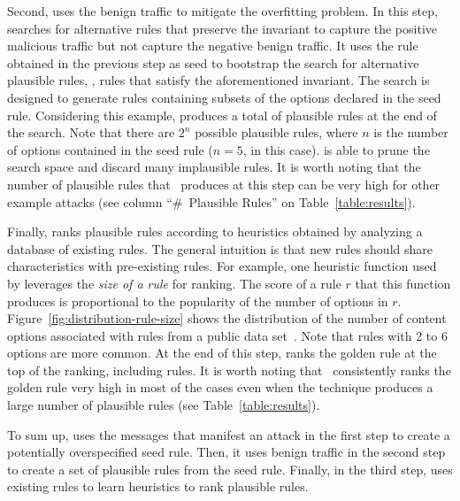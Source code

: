 \documentclass[sigconf,review, anonymous]{acmart}
\begin{document}


Second, \tname{} uses the benign traffic to mitigate the overfitting
problem. In this step, \tname{} searches for alternative rules that
preserve the invariant to capture the positive malicious traffic but
not capture the negative benign traffic. It uses the rule obtained in
the previous step as seed to bootstrap the search for alternative
plausible rules, \ie{}, rules that satisfy the aforementioned
invariant. The search is designed to generate rules containing subsets
of the options declared in the seed rule. Considering this example,
\tname{} produces a total of \pingscanplausible{}
plausible rules at the end of the search.  Note that there are $2^n$
possible plausible rules, where $n$ is the number of options contained
in the seed rule ($n=5$, in this case). \tname{} is able to prune the
search space and discard many implausible rules. It is worth noting
that the number of plausible rules that \tname\ produces at this step
can be very high for other example attacks (see column ``\#~Plausible
Rules'' on Table~\ref{table:results}).

Finally, \tname{} ranks plausible rules according to heuristics
obtained by analyzing a database of existing rules. The general
intuition is that new rules should share characteristics with
pre-existing rules. For example, one heuristic function used by
\tname{} leverages the \emph{size of a rule} for ranking.  The score
of a rule $r$ that this function produces is proportional to the
popularity of the number of options in
$r$. Figure~\ref{fig:distribution-rule-size} shows the distribution of
the number of content options associated with rules from a public data
set~\cite{emerging-threats-open}. Note that rules with 2 to 6 options
are more common. At the end of this step, \tname{} ranks the golden
rule at the top of the ranking, including \pingscanplausible{}
rules. It is worth noting that \tname\ consistently ranks the golden
rule very high in most of the cases even when the technique produces a
large number of plausible rules (see Table~\ref{table:results}).

To sum up, \tname{} uses the messages that manifest an attack in the
first step to create a potentially overspecified seed rule. Then, it
uses benign traffic in the second step to create a set of plausible
rules from the seed rule. Finally, in the third step, \tname{} uses
existing rules to learn heuristics to rank plausible rules.
\end{document}
